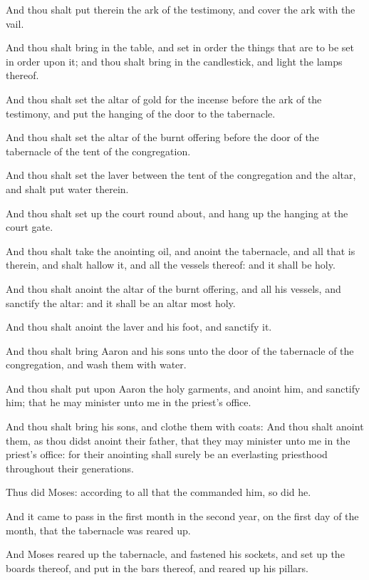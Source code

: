 \Verse And thou shalt put therein the ark of the testimony, and cover the ark with the vail.

\Verse And thou shalt bring in the table, and set in order the things that are to be set in order upon it; and thou shalt bring in the candlestick, and light the lamps thereof.

\Verse And thou shalt set the altar of gold for the incense before the ark of the testimony, and put the hanging of the door to the tabernacle.

\Verse And thou shalt set the altar of the burnt offering before the door of the tabernacle of the tent of the congregation.

\Verse And thou shalt set the laver between the tent of the congregation and the altar, and shalt put water therein.

\Verse And thou shalt set up the court round about, and hang up the hanging at the court gate.

\Verse And thou shalt take the anointing oil, and anoint the tabernacle, and all that is therein, and shalt hallow it, and all the vessels thereof: and it shall be holy.

\Verse And thou shalt anoint the altar of the burnt offering, and all his vessels, and sanctify the altar: and it shall be an altar most holy.

\Verse And thou shalt anoint the laver and his foot, and sanctify it.

\Verse And thou shalt bring Aaron and his sons unto the door of the tabernacle of the congregation, and wash them with water.

\Verse And thou shalt put upon Aaron the holy garments, and anoint him, and sanctify him; that he may minister unto me in the priest's office.

\Verse And thou shalt bring his sons, and clothe them with coats: \Verse And thou shalt anoint them, as thou didst anoint their father, that they may minister unto me in the priest's office: for their anointing shall surely be an everlasting priesthood throughout their generations.

\Verse Thus did Moses: according to all that the \LORD commanded him, so did he.

\Verse And it came to pass in the first month in the second year, on the first day of the month, that the tabernacle was reared up.

\Verse And Moses reared up the tabernacle, and fastened his sockets, and set up the boards thereof, and put in the bars thereof, and reared up his pillars.

